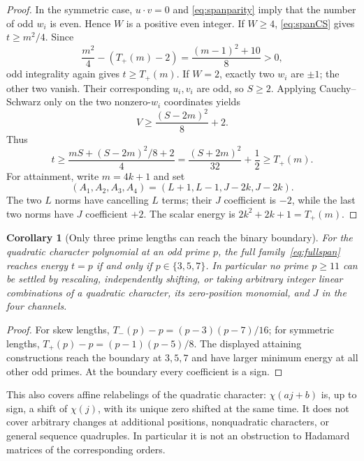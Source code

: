 \documentclass[11pt]{article}
\newtheorem{corollary}[theorem]{Corollary}
\begin{document}
\begin{proof}
In the symmetric case, $u\cdot v=0$ and
\eqref{eq:spanparity} imply that the number of odd $w_i$ is even.
Hence $W$ is a positive even integer. If $W\ge4$,
\eqref{eq:spanCS} gives $t\ge m^2/4$. Since
\[
 \frac{m^2}{4}-(T_+(m)-2)
 =\frac{(m-1)^2+10}{8}>0,
\]
odd integrality again gives $t\ge T_+(m)$. If $W=2$, exactly two
$w_i$ are $\pm1$; the other two vanish. Their corresponding $u_i,v_i$
are odd, so $S\ge2$. Applying Cauchy--Schwarz only on the two
nonzero-$w_i$ coordinates yields
\[
 V\ge\frac{(S-2m)^2}{8}+2.
\]
Thus
\[
 t\ge\frac{mS+(S-2m)^2/8+2}{4}
 =\frac{(S+2m)^2}{32}+\frac12\ge T_+(m).
\]
For attainment, write $m=4k+1$ and set
\[
 (A_1,A_2,A_3,A_4)=(L+1,L-1,J-2k,J-2k).
\]
The two $L$ norms have cancelling $L$ terms; their $J$ coefficient
is $-2$, while the last two norms have $J$ coefficient $+2$.
The scalar energy is $2k^2+2k+1=T_+(m)$.
\end{proof}

\begin{corollary}[Only three prime lengths can reach the binary boundary]
For the quadratic character polynomial at an odd prime $p$, the full
family~\eqref{eq:fullspan} reaches energy $t=p$ if and only if
$p\in\{3,5,7\}$. In particular no prime $p\ge11$ can be settled
by rescaling, independently shifting, or taking arbitrary integer
linear combinations of a quadratic character, its zero-position
monomial, and $J$ in the four channels.
\end{corollary}
\begin{proof}
For skew lengths,
$T_-(p)-p=(p-3)(p-7)/16$; for symmetric lengths,
$T_+(p)-p=(p-1)(p-5)/8$. The displayed attaining constructions
reach the boundary at $3,5,7$ and have larger minimum energy at all
other odd primes. At the boundary every coefficient is a sign.
\end{proof}

This also covers affine relabelings of the quadratic character:
$\chi(aj+b)$ is, up to sign, a shift of $\chi(j)$, with its unique
zero shifted at the same time. It does not cover arbitrary changes
at additional positions, nonquadratic characters, or general sequence
quadruples. In particular it is not an obstruction to Hadamard matrices
of the corresponding orders.
\end{document}
